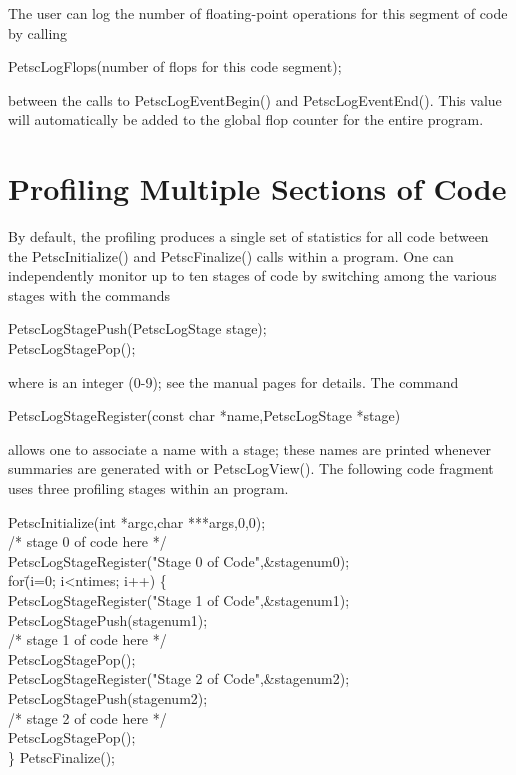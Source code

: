 {{The user can log the number of floating-point operations
for this segment of code by calling
\begin{tabbing}
    PetscLogFlops(number of flops for this code segment);
\end{tabbing}
between the calls to PetscLogEventBegin() and PetscLogEventEnd().
This value will automatically be added to the global flop counter for the
entire program.

\section{Profiling Multiple Sections of Code}
\label{sec_profstages}

By default, the profiling produces a single set of statistics for all
code between the PetscInitialize() and PetscFinalize()
calls within a program.  One can independently monitor up to ten
stages of code by switching among the various stages with the commands
\begin{tabbing}
   PetscLogStagePush(PetscLogStage stage);\\
   PetscLogStagePop();
\end{tabbing}
where  is an integer (0-9); see the manual pages for details.
The command
\begin{tabbing}
   PetscLogStageRegister(const char *name,PetscLogStage *stage)
\end{tabbing}
allows one to associate a name with a stage; these names are printed whenever
summaries are generated with  or PetscLogView().
The following code fragment uses three profiling stages within an program.

\begin{tabbing}
   PetscInitialize(int *argc,char ***args,0,0);\\
   /* stage 0 of code here */\\
   PetscLogStageRegister("Stage 0 of Code",\&stagenum0);\\
   for\= (i=0; i<ntimes; i++) \{\\
      \>PetscLogStageRegister("Stage 1 of Code",\&stagenum1);\\
      \>PetscLogStagePush(stagenum1);\\
      \>/* stage 1 of code here */\\
      \>PetscLogStagePop();\\
      \>PetscLogStageRegister("Stage 2 of Code",\&stagenum2);\\
      \>PetscLogStagePush(stagenum2);\\
      \>/* stage 2 of code here */\\
      \>PetscLogStagePop();\\
   \}
   PetscFinalize();
\end{tabbing}

}}
